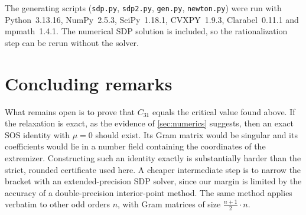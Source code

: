 \documentclass[11pt]{amsart}
\theoremstyle{definition}
\theoremstyle{remark}
\begin{document}
The generating scripts (\texttt{sdp.py}, \texttt{sdp2.py}, \texttt{gen.py}, \texttt{newton.py}) were run with Python~3.13.16, NumPy~2.5.3, SciPy~1.18.1, CVXPY~1.9.3, Clarabel~0.11.1 and mpmath~1.4.1. The numerical SDP solution is included, so the rationalization step can be rerun without the solver.

\section{Concluding remarks}

What remains open is to prove that $C_{31}$ equals the critical value found above. If the relaxation is exact, as the evidence of \cref{sec:numerics} suggests, then an exact SOS identity with $\mu=0$ should exist. Its Gram matrix would be singular and its coefficients would lie in a number field containing the coordinates of the extremizer. Constructing such an identity exactly is substantially harder than the strict, rounded certificate used here. A cheaper intermediate step is to narrow the bracket with an extended-precision SDP solver, since our margin is limited by the accuracy of a double-precision interior-point method. The same method applies verbatim to other odd orders $n$, with Gram matrices of size $\frac{n+1}{2}\cdot n$.



\end{document}
